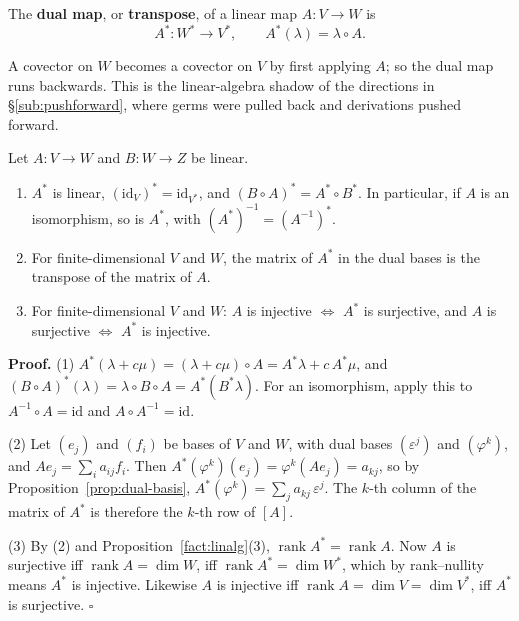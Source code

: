 \documentclass[11pt]{report}
\makeatletter
\newcounter{defcounter}[section]
\newcounter{thmcounter}[section]
\renewenvironment{proof}[1][Proof]{\noindent\textbf{#1.} }{\hfill$\square$\par\vspace{5pt}}
\newcommand{\thmlabel}[1]{\edef\@currentlabel{\arabic{section}.\arabic{thmcounter}}\label{#1}}
\newcommand{\deflabel}[1]{\edef\@currentlabel{\arabic{section}.\arabic{defcounter}}\label{#1}}
\newcommand{\leeref}[1]{\par\smallskip{\raggedleft\footnotesize\textsc{Lee}:\ #1\par}}
\makeatother
\begin{document}
\begin{defbox}\deflabel{def:dual-map}
The \textbf{dual map}, or \textbf{transpose}, of a linear map $A : V \to W$ is
\[
A^* : W^* \to V^*, \qquad A^*(\lambda) = \lambda \circ A .
\]
\leeref{Proposition 11.4}
\end{defbox}

\begin{center}
\end{center}

A covector on $W$ becomes a covector on $V$ by first applying $A$; so the dual map runs backwards. This is the linear-algebra shadow of the directions in \S\ref{sub:pushforward}, where germs were pulled back and derivations pushed forward.

\begin{propbox}\thmlabel{prop:dual-map}
Let $A : V \to W$ and $B : W \to Z$ be linear.
\begin{enumerate}
    \item $A^*$ is linear, $(\mathrm{id}_V)^* = \mathrm{id}_{V^*}$, and $(B \circ A)^* = A^* \circ B^*$. In particular, if $A$ is an isomorphism, so is $A^*$, with $(A^*)^{-1} = (A^{-1})^*$.
    \item For finite-dimensional $V$ and $W$, the matrix of $A^*$ in the dual bases is the transpose of the matrix of $A$.
    \item For finite-dimensional $V$ and $W$: $A$ is injective $\iff$ $A^*$ is surjective, and $A$ is surjective $\iff$ $A^*$ is injective.
\end{enumerate}
\leeref{Proposition 11.4}
\end{propbox}

\begin{proof}
(1) $A^*(\lambda + c\mu) = (\lambda + c\mu) \circ A = A^*\lambda + c\,A^*\mu$, and $(B \circ A)^*(\lambda) = \lambda \circ B \circ A = A^*(B^*\lambda)$. For an isomorphism, apply this to $A^{-1} \circ A = \mathrm{id}$ and $A \circ A^{-1} = \mathrm{id}$.

(2) Let $(e_j)$ and $(f_i)$ be bases of $V$ and $W$, with dual bases $(\varepsilon^j)$ and $(\varphi^k)$, and $Ae_j = \sum_i a_{ij} f_i$. Then $A^*(\varphi^k)(e_j) = \varphi^k(Ae_j) = a_{kj}$, so by Proposition~\ref{prop:dual-basis}, $A^*(\varphi^k) = \sum_j a_{kj}\,\varepsilon^j$. The $k$-th column of the matrix of $A^*$ is therefore the $k$-th row of $[A]$.

(3) By (2) and Proposition~\ref{fact:linalg}(3), $\operatorname{rank} A^* = \operatorname{rank} A$. Now $A$ is surjective iff $\operatorname{rank} A = \dim W$, iff $\operatorname{rank} A^* = \dim W^*$, which by rank--nullity means $A^*$ is injective. Likewise $A$ is injective iff $\operatorname{rank} A = \dim V = \dim V^*$, iff $A^*$ is surjective.
\end{proof}
\end{document}
